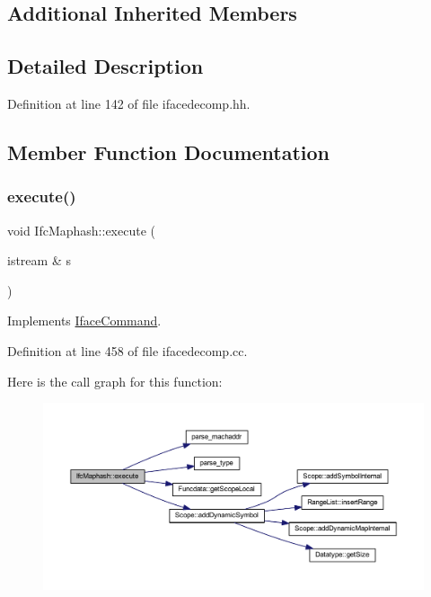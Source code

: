 \subsection*{Additional Inherited Members}


\subsection{Detailed Description}


Definition at line 142 of file ifacedecomp.\+hh.



\subsection{Member Function Documentation}
\mbox{\label{class_ifc_maphash_ae57da41dbb958189c2b6101ecfdc3293}} 
\subsubsection{\texorpdfstring{execute()}{execute()}}
{\footnotesize\ttfamily void Ifc\+Maphash\+::execute (\begin{DoxyParamCaption}\item[{istream \&}]{s }\end{DoxyParamCaption})\hspace{0.3cm}{\ttfamily [virtual]}}



Implements \mbox{\hyperlink{class_iface_command_af10e29cee2c8e419de6efe9e680ad201}{Iface\+Command}}.



Definition at line 458 of file ifacedecomp.\+cc.

Here is the call graph for this function\+:
\nopagebreak
\begin{figure}[H]
\begin{center}
\leavevmode
\includegraphics[width=350pt]{class_ifc_maphash_ae57da41dbb958189c2b6101ecfdc3293_cgraph}
\end{center}
\end{figure}


